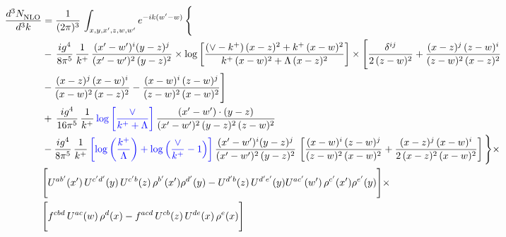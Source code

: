 \documentclass[9pt]{article}
\numberwithin{equation}{section}
\begin{document}
\begin{align}
     \frac{d^{3}N_{\rm NLO}^{\rm}}{d^{3}k}  & =  \frac{1}{(2\pi)^{3}}\, \int_{x,y,x',z,w,w^{\prime}} e^{-ik(w^{\prime}-w)}\, \Bigg\{\notag \\ & -\,\frac{ig^{4}}{8\pi^{5}}\,\frac{1}{k^{+}}\,\frac{(x'-w')^{i}(y-z)^{j}}{(x'-w')^{2}\,(y-z)^{2}}\times \log{\left[\frac{(\vee-k^{+})\,(x-z)^{2}+k^{+}\,(x-w)^{2}}{k^{+}\,(x-w)^{2}+\Lambda\, (x-z)^{2}}\right]}\times \Bigg[\frac{\delta^{ij}}{2\,(z-w)^{2}}+\frac{(x-z)^{j}\,(z-w)^{i}}{(z-w)^{2}\,(x-z)^{2}}\notag \\ & -\frac{(x-z)^{j}\,(x-w)^{i}}{(x-w)^{2}\,(x-z)^{2}}-\frac{(x-w)^{i}\,(z-w)^{j}}{(z-w)^{2}\,(x-w)^{2}}\Bigg]\notag \\ & +\,\frac{ig^{4}}{16\pi^{5}}\,\frac{1}{k^{+}}\,{\color{blue}\log{\left[\frac{\vee}{k^{+}+\Lambda}\right]}}\, \frac{(x'-w')\cdot (y-z)}{(x'-w')^{2}\,(y-z)^{2}\,(z-w)^{2}}\notag \\ & -\frac{ig^{4}}{8\pi^{5}}\,\frac{1}{k^{+}}\,{\color{blue}\left[\log{\left(\frac{k^{+}}{\Lambda}\right)}+\log{\left(\frac{\vee}{k^{+}}-1\right)}\right]}\,\frac{(x'-w')^{i}(y-z)^{j}}{(x'-w')^{2}\,(y-z)^{2}}\,\left[\frac{(x-w)^{i}\,(z-w)^{j}}{(z-w)^{2}\,(x-w)^{2}}+\frac{(x-z)^{j}\,(x-w)^{i}}{2\,(x-z)^{2}\, (x-w)^{2}}\right]\Bigg\}\times \notag \\ &  \Bigg[U^{ab'}(x')\,U^{c'd'}(y)\,U^{c'b}(z)\,\rho^{b'}(x')\rho^{d'}(y)-U^{d'b}(z)\,U^{d'e'}(y)U^{ac'}(w')\,\rho^{c'}(x')\rho^{e'}(y)\Bigg]\times\notag \\ & \Bigg[f^{cbd}\,U^{ac}(w)\,\rho^{d}(x)-f^{acd}\, U^{cb}(z)\,U^{de}(x)\,\rho^{e}(x)\Bigg] 
\end{align}
\end{document}
